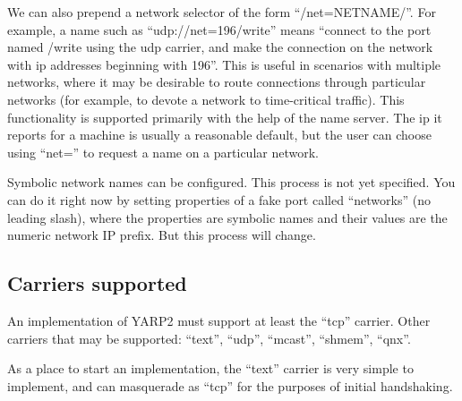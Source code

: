 \documentclass[a4]{article}
\begin{document}
We can also prepend a network selector of the form
``/net=NETNAME/''.  For example, a name such as
``udp://net=196/write'' means ``connect to the 
port named /write using the udp carrier, and make the
connection on the network with ip addresses beginning with
196''.
%
This is useful in scenarios with multiple networks, where it may be
desirable to route connections through particular networks (for
example, to devote a network to time-critical traffic).  This
functionality is supported primarily with the help of the name server.
The ip it reports for a machine is usually a reasonable default, but
the user can choose using ``net='' to request a name on a particular
network.

Symbolic network names can be configured.  This process is not yet
specified.  You can do it right now by setting properties of a fake
port called ``networks'' (no leading slash), where the properties are
symbolic names and their values are the numeric network IP prefix.
But this process will change.







\subsection{Carriers supported}

An implementation of YARP2 must support at least the ``tcp'' carrier.
Other carriers that may be supported:
``text'', ``udp'', ``mcast'', ``shmem'', ``qnx''.

As a place to start an implementation, the ``text'' carrier is very
simple to implement, and can masquerade as ``tcp'' for the purposes
of initial handshaking.
\end{document}

